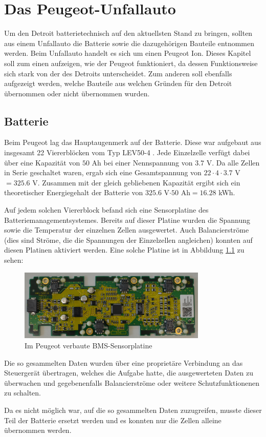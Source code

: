 \chapter{Das Peugeot-Unfallauto}
Um den Detroit batterietechnisch auf den aktuellsten Stand zu bringen, sollten aus einem Unfallauto die Batterie sowie die dazugehörigen Bauteile entnommen werden. Beim Unfallauto handelt es sich um einen Peugeot Ion. Dieses Kapitel soll zum einen aufzeigen, wie der Peugeot funktioniert, da dessen Funktionsweise sich stark von der des Detroits unterscheidet. Zum anderen soll ebenfalls aufgezeigt werden, welche Bauteile aus welchen Gründen für den Detroit übernommen oder nicht übernommen wurden.

\section{Batterie}
Beim Peugeot lag das Hauptaugenmerk auf der Batterie. Diese war aufgebaut aus insgesamt 22 Viererblöcken vom Typ LEV50-4 \cite{lev50}. Jede Einzelzelle verfügt dabei über eine Kapazität von $50$ Ah bei einer Nennspannung von $3.7$ V. Da alle Zellen in Serie geschaltet waren, ergab sich eine Gesamtspannung von $22\cdot 4\cdot 3.7$ V$=325.6$ V. Zusammen mit der gleich gebliebenen Kapazität ergibt sich ein theoretischer Energiegehalt der Batterie von $325.6$ V$\cdot50$ Ah$=16.28$ kWh.

Auf jedem solchen Viererblock befand sich eine Sensorplatine des Batteriemanagementsystemes. Bereits auf dieser Platine wurden die Spannung sowie die Temperatur der einzelnen Zellen ausgewertet. Auch Balancierströme (dies sind Ströme, die die Spannungen der Einzelzellen angleichen) konnten auf diesen Platinen aktiviert werden. Eine solche Platine ist in Abbildung \ref{fig:BMS_Alt} zu sehen:

\begin{figure}[h!]
	\centering
		\includegraphics[width=0.80\textwidth]{images/BMS_Alt.JPG}
	\caption{Im Peugeot verbaute BMS-Sensorplatine}
	\label{fig:BMS_Alt}
\end{figure}

Die so gesammelten Daten wurden über eine proprietäre Verbindung an das Steuergerät übertragen, welches die Aufgabe hatte, die ausgewerteten Daten zu überwachen und gegebenenfalls Balancierströme oder weitere Schutzfunktionenen zu schalten.

Da es nicht möglich war, auf die so gesammelten Daten zuzugreifen, musste dieser Teil der Batterie ersetzt werden und es konnten nur die Zellen alleine übernommen werden.


\newpage